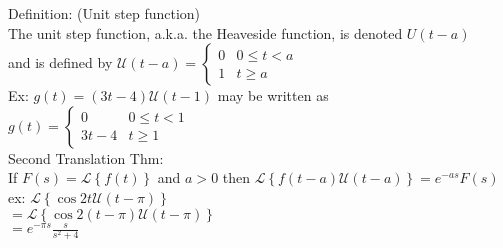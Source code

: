 \documentclass[a4paper, 12pt]{article}
\renewcommand{\L}[1] {\ensuremath{\mathscr{L}\left\{#1\right\}}}
\newcommand{\U}[1] {\ensuremath{\mathscr{U}\left(#1\right)}}
\begin{document}
    Definition: (Unit step function)\\
    The unit step function, a.k.a. the Heaveside function, is denoted $ U(t-a) $\\
    and is defined by $ \U{t-a} = \begin{cases}
        0 & 0 \le t < a\\
        1 & t \ge a
    \end{cases} $\\[10px]
    Ex: $g(t) = (3t-4)\U{t-1}$ may be written as $g(t) = \begin{cases} 0 & 0 \le t < 1\\ 3t-4 & t \ge 1 \end{cases} $\\[20px]
    Second Translation Thm:\\
    If $F(s) = \L{f(t)}$ and $a > 0$ then $\L{f(t-a)\U{t-a}} = e^{-as}F(s)$\\[20px]
    ex: $ \L{\cos{2t}\U{t-\pi}} $\\[10px]
    $ = \L{\cos{2(t-\pi)}\U{t-\pi}} $\\[10px]
    $ = e^{-\pi s}\frac{s}{s^2 + 4} $\\[10px]
    
\end{document}
